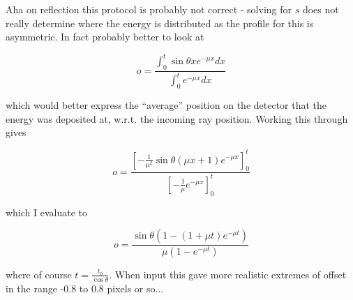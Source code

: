 \documentclass{article}
\begin{document}
Aha on reflection this protocol is probably not correct - solving for
$s$ does not really determine where the energy is distributed as the
profile for this is asymmetric. In fact probably better to look at

\begin{equation}
o = \frac{\int_0^t \sin \theta x e^{-\mu x} dx}{\int_0^t e^{-\mu x} dx}
\end{equation}

\noindent
which would better express the ``average'' position on the detector
that the energy was deposited at, w.r.t. the incoming ray
position. Working this through gives

\begin{equation}
o = \frac{\left[ - \frac{1}{\mu^2} \sin \theta \left( \mu x + 1
    \right)e^{-\mu x} \right]_0^t}
{\left[ - \frac{1}{\mu} e^{-\mu x} \right]_0^t}
\end{equation}

\noindent
which I evaluate to

\begin{equation}
o = \frac{\sin \theta \left( 1 - \left( 1 + \mu t
    \right) e^{-\mu t}\right)} {\mu \left( 1 - e^{-\mu t} \right)}
\end{equation}

\noindent
where of course $t = \frac{t_0}{\cos \theta}$. When input this gave
more realistic extremes of offset in the range 
-0.8 to 0.8 pixels or so... 
\end{document}
